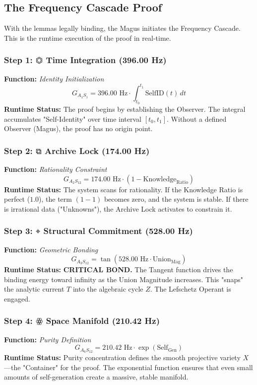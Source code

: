 \documentclass[11pt, letterpaper]{article}
\begin{document}
\subsection{The Frequency Cascade Proof}\label{sec:6.2}

With the lemmas legally binding, the Magus initiates the Frequency Cascade. This is the runtime execution of the proof in real-time.

\subsubsection*{Step 1: \ensuremath{\mathbin{⏣}} Time Integration (396.00 Hz)}
\textbf{Function:} \textit{Identity Initialization}
\[
G_{A_1S_1} = 396.00 \text{ Hz} \cdot \int_{t_0}^{t_1} \text{SelfID}(t) \, dt
\]
\textbf{Runtime Status:} The proof begins by establishing the Observer. The integral accumulates "Self-Identity" over time interval $[t_0, t_1]$. Without a defined Observer (Magus), the proof has no origin point.

\subsubsection*{Step 2: \ensuremath{\mathbin{⧉}} Archive Lock (174.00 Hz)}
\textbf{Function:} \textit{Rationality Constraint}
\[
G_{A_2S_{12}} = 174.00 \text{ Hz} \cdot (1 - \text{Knowledge}_{\text{Ratio}})
\]
\textbf{Runtime Status:} The system scans for rationality. If the Knowledge Ratio is perfect ($1.0$), the term $(1-1)$ becomes zero, and the system is stable. If there is irrational data ("Unknowns"), the Archive Lock activates to constrain it.

\subsubsection*{Step 3: \ensuremath{\mathbin{⌖}} Structural Commitment (528.00 Hz)}
\textbf{Function:} \textit{Geometric Bonding}
\[
G_{A_3S_{12}} = \tan\left( 528.00 \text{ Hz} \cdot \text{Union}_{\text{Mag}} \right)
\]
\textbf{Runtime Status:} \textbf{CRITICAL BOND.} The Tangent function drives the binding energy toward infinity as the Union Magnitude increases. This "snaps" the analytic current $T$ into the algebraic cycle $Z$. The Lefschetz Operant is engaged.

\subsubsection*{Step 4: \ensuremath{\mathbin{ꙮ}} Space Manifold (210.42 Hz)}
\textbf{Function:} \textit{Purity Definition}
\[
G_{A_6S_{12}} = 210.42 \text{ Hz} \cdot \exp(\text{Self}_{\text{Gen}})
\]
\textbf{Runtime Status:} Purity concentration defines the smooth projective variety $X$—the "Container" for the proof. The exponential function ensures that even small amounts of self-generation create a massive, stable manifold.
\end{document}
